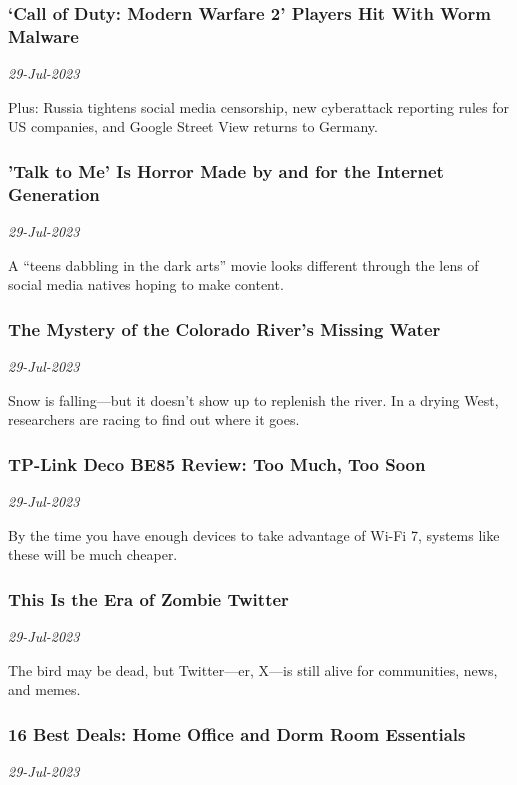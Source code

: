 \subsubsection{‘Call of Duty: Modern Warfare 2’ Players Hit With Worm Malware \href{https://www.wired.com/story/call-of-duty-modern-warfare-2-malware/}{}}
\textit{29-Jul-2023}

Plus: Russia tightens social media censorship, new cyberattack reporting rules for US companies, and Google Street View returns to Germany.
\subsubsection{'Talk to Me' Is Horror Made by and for the Internet Generation \href{https://www.wired.com/story/talk-to-me-movie-review/}{}}
\textit{29-Jul-2023}

A “teens dabbling in the dark arts” movie looks different through the lens of social media natives hoping to make content.
\subsubsection{The Mystery of the Colorado River’s Missing Water \href{https://www.wired.com/story/the-mystery-of-the-colorado-rivers-missing-water/}{}}
\textit{29-Jul-2023}

Snow is falling—but it doesn’t show up to replenish the river. In a drying West, researchers are racing to find out where it goes.
\subsubsection{TP-Link Deco BE85 Review: Too Much, Too Soon \href{https://www.wired.com/review/tp-link-deco-be85/}{}}
\textit{29-Jul-2023}

By the time you have enough devices to take advantage of Wi-Fi 7, systems like these will be much cheaper.
\subsubsection{This Is the Era of Zombie Twitter \href{https://www.wired.com/story/x-twitter-rebrand-dead/}{}}
\textit{29-Jul-2023}

The bird may be dead, but Twitter—er, X—is still alive for communities, news, and memes.
\subsubsection{16 Best Deals: Home Office and Dorm Room Essentials \href{https://www.wired.com/story/weekend-deals-july-29-2023/}{}}
\textit{29-Jul-2023}

